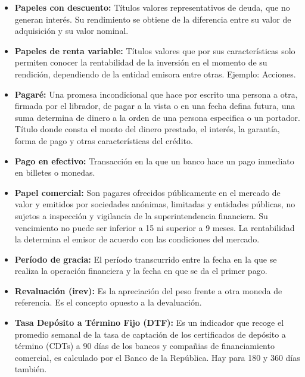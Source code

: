 \begin{itemize}
	\item {\textbf{Papeles con descuento: }}
	      Títulos valores representativos de deuda, que no generan interés. Su rendimiento se obtiene de la diferencia entre su valor de adquisición y su valor nominal.
	      \\
	\item {\textbf{Papeles de renta variable: }}
	      Títulos valores que por sus características solo permiten conocer la rentabilidad de la inversión en el momento de su rendición, dependiendo de la entidad emisora entre otras. Ejemplo: Acciones.
	      \\
	\item {\textbf{Pagaré: }}
	      Una promesa incondicional que hace por escrito una persona a otra, firmada por el librador, de pagar a la vista o en una fecha defina futura, una suma determina de dinero a la orden de una persona especifica o un portador.
	      \\
	      Título donde consta el monto del dinero prestado, el interés, la garantía, forma de pago y otras características del crédito.
	      \\
	\item {\textbf{Pago en efectivo: }}
	      Transacción en la que un banco hace un pago inmediato en billetes o monedas.
	      \\
	\item {\textbf{Papel comercial: }}
	      Son pagares ofrecidos públicamente en el mercado de valor y emitidos por sociedades anónimas, limitadas y entidades públicas, no sujetos a inspección y vigilancia de la superintendencia financiera. Su vencimiento no puede ser inferior a 15 ni superior a 9 meses. La rentabilidad la determina el emisor de acuerdo con las condiciones del mercado.
	      \\
	\item {\textbf{Período de gracia: }}
	      El período transcurrido entre la fecha en la que se realiza la operación financiera y la fecha en que se da el primer pago.
	      
	\item {\textbf{Revaluación (irev): }}
	      Es la apreciación del peso frente a otra moneda de referencia. Es el concepto opuesto a la devaluación.\\
	      
	\item {\textbf{Tasa Depósito a Término Fijo (DTF): }}
	      Es un indicador que recoge el promedio semanal de la tasa de captación de los certificados de depósito a término (CDTs) a 90 días de los bancos y compañias de financiamiento comercial, es calculado por el Banco de la República. Hay para 180 y 360 días también. \\
	      

\end{itemize}
